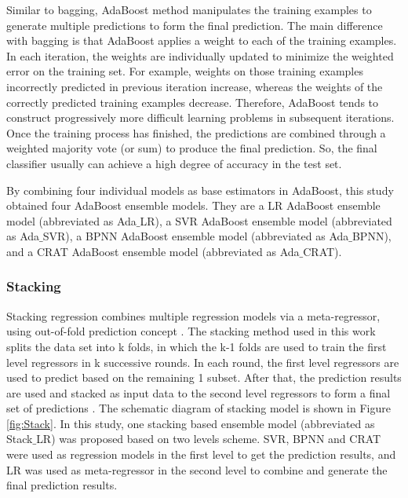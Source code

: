 \documentclass[11pt]{article}
\begin{document}
	
	Similar to bagging, AdaBoost method \cite{freund1996experiments} manipulates the training examples to generate multiple predictions to form the final prediction. The main difference with bagging is that AdaBoost applies a weight to each of the training examples. In each iteration, the weights are individually updated to minimize the weighted error on the training set. For example, weights on those training examples incorrectly predicted in previous iteration increase, whereas the weights of the correctly predicted training examples decrease. Therefore, AdaBoost tends to construct progressively more difficult learning problems in subsequent iterations. Once the training process has finished, the predictions are combined through a weighted majority vote (or sum) to produce the final prediction. So, the final classifier usually can achieve a high degree of accuracy in the test set.
	
By combining four individual models as base estimators in AdaBoost, this study obtained four AdaBoost ensemble models. They are a LR AdaBoost ensemble model (abbreviated as Ada$\_$LR), a SVR AdaBoost ensemble model (abbreviated as Ada$\_$SVR), a BPNN AdaBoost ensemble model (abbreviated as Ada$\_$BPNN), and a CRAT AdaBoost ensemble model (abbreviated as Ada$\_$CRAT). 

	
	\subsubsection{Stacking}

	
	Stacking regression combines multiple regression models via a meta-regressor, using out-of-fold prediction concept \cite{raschkas_2018_mlxtend}. The stacking method used in this work splits the data set into k folds, in which the k-1 folds are used to train the first level regressors in k successive rounds. In each round, the first level regressors are used to predict based on the remaining 1 subset. After that, the prediction results are used and stacked as input data to the second level regressors to form a final set of predictions \cite{sill2009feature}. The schematic diagram of stacking model is shown in Figure \ref{fig:Stack}.  In this study, one stacking based ensemble model (abbreviated as Stack$\_$LR) was proposed based on two levels scheme. SVR, BPNN and CRAT were used as regression models in the first level to get the prediction results, and LR was used as meta-regressor in the second level to combine and generate the final prediction results.
	
\end{document}
